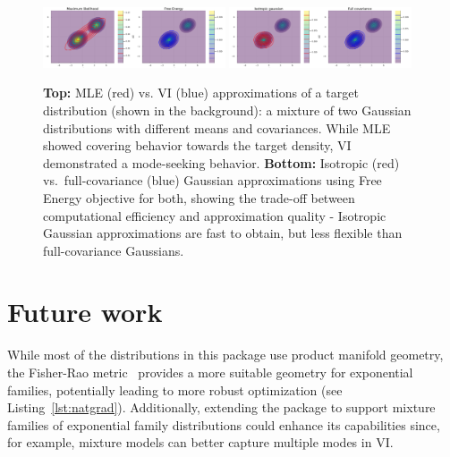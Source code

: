 \documentclass{juliacon}
\begin{document}

\begin{figure}[tb]
   \includegraphics[width=0.48\textwidth]{plots/comparison1.pdf}
   \includegraphics[width=0.48\textwidth]{plots/comparison2.pdf}
   \caption{\textbf{Top:} MLE (red) vs. VI (blue) approximations of a target distribution (shown in the background): a mixture of two Gaussian distributions with different means and covariances. While MLE showed covering behavior towards the target density, VI demonstrated a mode-seeking behavior. \textbf{Bottom:} Isotropic (red) vs.\ full-covariance (blue) Gaussian approximations using Free Energy objective for both, showing the trade-off between computational efficiency and approximation quality - Isotropic Gaussian approximations are fast to obtain, but less flexible than full-covariance Gaussians.}
   \label{fig:comparisons}
\end{figure}

\section{Future work}
While most of the distributions in this package use product manifold geometry, the Fisher-Rao metric~\cite{amari_natural_1998} provides a more suitable geometry for exponential families, potentially leading to more robust optimization (see Listing~\ref{lst:natgrad}). Additionally, extending the package to support mixture families of exponential family distributions could enhance its capabilities since, for example, mixture models can better capture multiple modes in VI.




\end{document}
